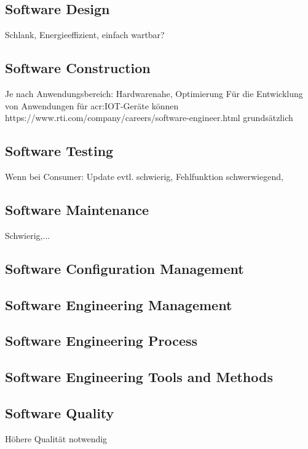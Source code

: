 \subsection{Software Design}
Schlank, Energieeffizient, einfach wartbar?

\subsection{Software Construction}
Je nach Anwendungsbereich: Hardwarenahe, Optimierung
Für die Entwicklung von Anwendungen für \gls{acr:IOT}-Geräte können
https://www.rti.com/company/careers/software-engineer.html grundsätzlich

\subsection{Software Testing}
Wenn bei Consumer: Update evtl. schwierig, Fehlfunktion schwerwiegend,

\subsection{Software Maintenance}
Schwierig,...

\subsection{Software Configuration Management}


\subsection{Software Engineering Management}


\subsection{Software Engineering Process}


\subsection{Software Engineering Tools and Methods}


\subsection{Software Quality}
Höhere Qualität notwendig